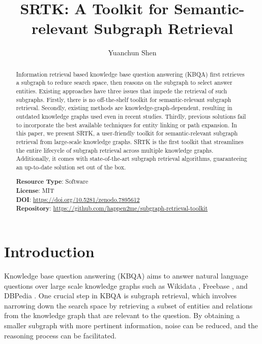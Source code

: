 \documentclass[runningheads]{llncs}
\begin{document}
%
\title{SRTK: A Toolkit for Semantic-relevant Subgraph Retrieval}
%
%
\author{Yuanchun Shen }
%
%
%
\maketitle              %
%
\begin{abstract}
Information retrieval based knowledge base question answering (KBQA) first retrieves a subgraph to reduce search space, then reasons on the subgraph to select answer entities. Existing approaches have three issues that impede the retrieval of such subgraphs. Firstly, there is no off-the-shelf toolkit for semantic-relevant subgraph retrieval. Secondly, existing methods are knowledge-graph-dependent, resulting in outdated knowledge graphs used even in recent studies. Thirdly, previous solutions fail to incorporate the best available techniques for entity linking or path expansion. In this paper, we present SRTK, a user-friendly toolkit for semantic-relevant subgraph retrieval from large-scale knowledge graphs. SRTK is the first toolkit that streamlines the entire lifecycle of subgraph retrieval across multiple knowledge graphs. Additionally, it comes with state-of-the-art subgraph retrieval algorithms, guaranteeing an up-to-date solution set out of the box.

\textbf{Resource Type}: Software \\
\textbf{License}: MIT \\
\textbf{DOI}: \url{https://doi.org/10.5281/zenodo.7895612} \\
\textbf{Repository}: \url{https://github.com/happen2me/subgraph-retrieval-toolkit}
\end{abstract}
%
%
%
\section{Introduction}

Knowledge base question answering (KBQA) aims to answer natural language questions over large scale knowledge graphs such as Wikidata \cite{vrandevcic2014wikidata}, Freebase \cite{bollacker2008freebase}, and DBPedia \cite{auer2007dbpedia}.  One crucial step in KBQA is subgraph retrieval, which involves narrowing down the search space by retrieving a subset of entities and relations from the knowledge graph that are relevant to the question. By obtaining a smaller subgraph with more pertinent information, noise can be reduced, and the reasoning process can be facilitated.
\end{document}
